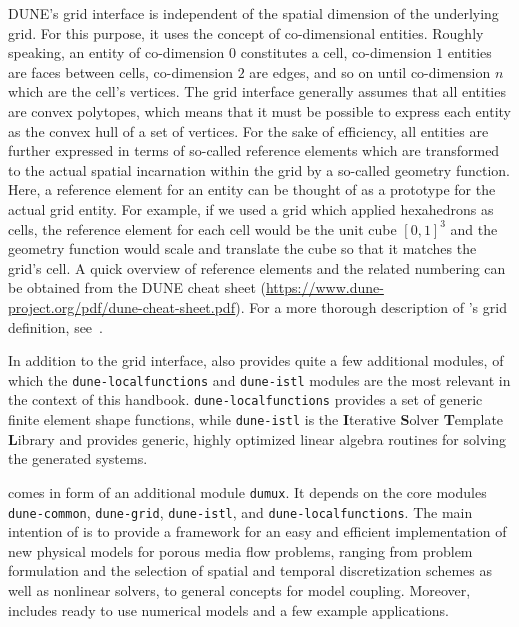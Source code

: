 DUNE's grid interface is independent of the spatial dimension of the
underlying grid. For this purpose, it uses the concept of
co-dimensional entities. Roughly speaking, an entity of co-dimension
$0$ constitutes a cell, co-dimension $1$ entities are faces between
cells, co-dimension $2$ are edges, and so on until co-dimension $n$
which are the cell's vertices.  The \Dune grid interface generally
assumes that all entities are convex polytopes, which means that it
must be possible to express each entity as the convex hull of a set of
vertices. For the sake of efficiency, all entities are further expressed in terms
of so-called reference elements which are transformed to the actual
spatial incarnation within the grid by a so-called geometry
function. Here, a reference element for an
entity can be thought of as a prototype for the actual grid
entity. For example, if we used a grid which applied hexahedrons as cells,
the reference element for each cell would be the unit cube $[0, 1]^3$
and the geometry function would scale and translate the cube so that
it matches the grid's cell. A quick overview of reference elements and the
related numbering can be obtained from the DUNE cheat sheet
(\url{https://www.dune-project.org/pdf/dune-cheat-sheet.pdf}).
For a more thorough description of \Dune's
grid definition, see~\cite{BASTIAN2008}.

In addition to the grid interface, \Dune also provides quite a few
additional modules, of which the \texttt{dune-localfunctions} and
\texttt{dune-istl} modules are the most relevant in the context of
this handbook. \texttt{dune-localfunctions} provides a set of generic
finite element shape functions, while \texttt{dune-istl} is the
\textbf{I}terative \textbf{S}olver \textbf{T}emplate \textbf{L}ibrary
and provides generic, highly optimized linear algebra routines for
solving the generated systems.

\Dumux comes in form of an additional module \texttt{dumux}.
It depends on the \Dune core modules
\texttt{dune-common}, \texttt{dune-grid}, \texttt{dune-istl}, and \texttt{dune-localfunctions}.
The main intention of \Dumux is to provide a framework for an easy and efficient
implementation of new physical models for porous media flow problems,
ranging from problem formulation and the selection of
spatial and temporal discretization schemes as well as nonlinear solvers,
to general concepts for model coupling.
Moreover, \Dumux includes ready to use numerical models and a few example applications.

